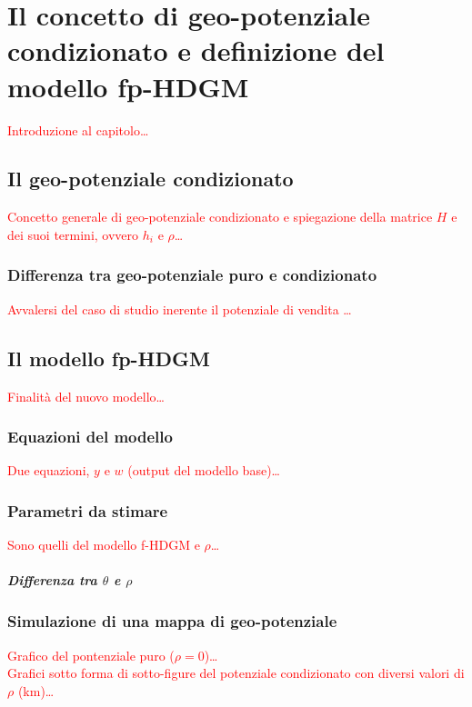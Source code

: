 \chapter[Il concetto di geo-potenziale condizionato e il modello fp-HDGM]{Il concetto di geo-potenziale condizionato e definizione del modello fp-HDGM}

\textcolor{red}{Introduzione al capitolo\dots}

\section[Il geo-potenziale condizionato]{Il geo-potenziale condizionato}
\textcolor{red}{Concetto generale di geo-potenziale condizionato e spiegazione della matrice $H$ e dei suoi termini, ovvero $h_i$ e $\rho$\dots}

\subsection[Differenza tra geo-potenziale puro e condizionato]{Differenza tra geo-potenziale puro e condizionato}
\textcolor{red}{Avvalersi del caso di studio inerente il potenziale di vendita \dots}

\section[Il modello fp-HDGM]{Il modello fp-HDGM}
\textcolor{red}{Finalità del nuovo modello\dots}

\subsection[Equazioni del modello]{Equazioni del modello}
\textcolor{red}{Due equazioni, $y$ e $w$ (output del modello base)\dots}

\subsection[Parametri da stimare]{Parametri da stimare}
\textcolor{red}{Sono quelli del modello f-HDGM e $\rho$\dots}

\paragraph[Differenza tra $\theta$ e $\rho$]{Differenza tra $\theta$ e $\rho$}

\subsection[Simulazione di una mappa di geo-potenziale]{Simulazione di una mappa di geo-potenziale}
\textcolor{red}{Grafico del pontenziale puro ($\rho=0$)\dots}\\
\textcolor{red}{Grafici sotto forma di sotto-figure del potenziale condizionato con diversi valori di $\rho$ (\si{\kilo\meter})\dots}